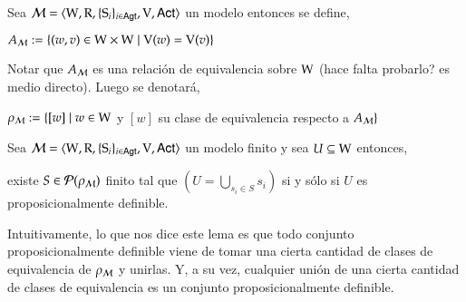 \begin{definicion}
    Sea $\mathcal{M}=\langle \mathrm{W},\mathrm{R},\{ \mathrm{S}_i \}_{i \in {\rm \sf Agt}},\mathrm{V},{\rm \sf Act} \rangle$ un modelo entonces se define, 
    \begin{center}
        $A_{\mathcal{M}} := \{(w,v) \in \mathrm{W} \times \mathrm{W} \mid \mathrm{V}(w) = \mathrm{V}(v)\}$
    \end{center}
    Notar que $A_{\mathcal{M}}$ es una relación de equivalencia sobre $\mathrm{W}$ (hace falta probarlo? es medio directo). Luego se denotará,
    \begin{center}
        $\rho_{\mathcal{M}} := \{ [w] \mid w \in \mathrm{W} $ y $[w]$ su clase de equivalencia respecto a $A_{\mathcal{M}}\}$
    \end{center}
\end{definicion}


\begin{lema}
    Sea $\mathcal{M}=\langle \mathrm{W},\mathrm{R},\{ \mathrm{S}_i \}_{i \in {\rm \sf Agt}},\mathrm{V},{\rm \sf Act} \rangle$ un modelo finito y sea $U \subseteq \mathrm{W}$ entonces,
    \begin{center}

    existe $S \in \mathcal{P}(\rho_{\mathcal{M}})$ finito tal que  $(U = \bigcup\limits_{s_i \in S} s_{i})$ \quad si y sólo si \quad $U$ es proposicionalmente definible. 
    \end{center}
\end{lema}

Intuitivamente, lo que nos dice este lema es que todo conjunto proposicionalmente definible viene de tomar una cierta cantidad de clases de equivalencia de $\rho_{\mathcal{M}}$ y unirlas. Y, a su vez, cualquier unión de una cierta cantidad de clases de equivalencia es un conjunto proposicionalmente definible. 


